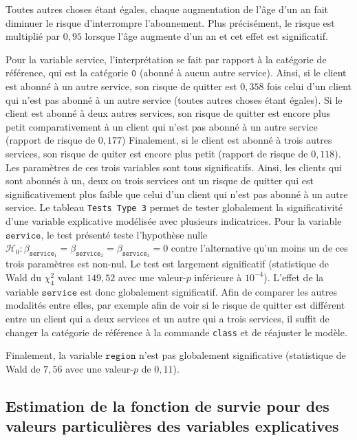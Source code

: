 \documentclass[
  11pt,
  letterpaper,
]{book}
\theoremstyle{definition}
\theoremstyle{definition}
\theoremstyle{definition}
\theoremstyle{remark}
\begin{document}
Toutes autres choses étant égales, chaque augmentation de l'âge d'un an fait diminuer le risque d'interrompre l'abonnement. Plus précisément, le risque est multiplié par \(0,95\) lorsque l'âge augmente d'un an et cet effet est significatif.

Pour la variable service, l'interprétation se fait par rapport à la catégorie de référence, qui est la catégorie \(\texttt{0}\) (abonné à aucun autre service). Ainsi, si le client est abonné à un autre service, son risque de quitter est \(0,358\) fois celui d'un client qui n'est pas abonné à un autre service (toutes autres choses étant égales). Si le client est abonné à deux autres services, son risque de quitter est encore plus petit comparativement à un client qui n'est pas abonné à un autre service (rapport de risque de \(0,177\)) Finalement, si le client est abonné à trois autres services, son risque de quiter est encore plus petit (rapport de risque de \(0,118\)). Les paramètres de ces trois variables sont tous significatifs. Ainsi, les clients qui sont abonnés à un, deux ou trois services ont un risque de quitter qui est significativement plus faible que celui d'un client qui n'est pas abonné à un autre service. Le tableau \texttt{Tests\ Type\ 3} permet de tester globalement la significativité d'une variable explicative modélisée avec plusieurs indicatrices. Pour la variable \(\texttt{service}\), le test présenté teste l'hypothèse nulle \(\mathcal{H}_0: \beta_{\texttt{service}_1}=\beta_{\texttt{service}_2}=\beta_{\texttt{service}_3}=0\) contre l'alternative qu'un moins un de ces trois paramètres est non-nul. Le test est largement significatif (statistique de Wald du \(\chi^2_4\) valant \(149,52\) avec une valeur-\(p\) inférieure à \(10^{-4}\)). L'effet de la variable \(\texttt{service}\) est donc globalement significatif. Afin de comparer les autres modalités entre elles, par exemple afin de voir si le risque de quitter est différent entre un client qui a deux services et un autre qui a trois services, il suffit de changer la catégorie de référence à la commande \texttt{class} et de réajuster le modèle.

Finalement, la variable \(\texttt{region}\) n'est pas globalement significative (statistique de Wald de \(7,56\) avec une valeur-\(p\) de \(0,11\)).

\hypertarget{estimation-de-la-fonction-de-survie-pour-des-valeurs-particuliuxe8res-des-variables-explicatives}{%
\subsection{Estimation de la fonction de survie pour des valeurs particulières des variables explicatives}\label{estimation-de-la-fonction-de-survie-pour-des-valeurs-particuliuxe8res-des-variables-explicatives}}
\end{document}
